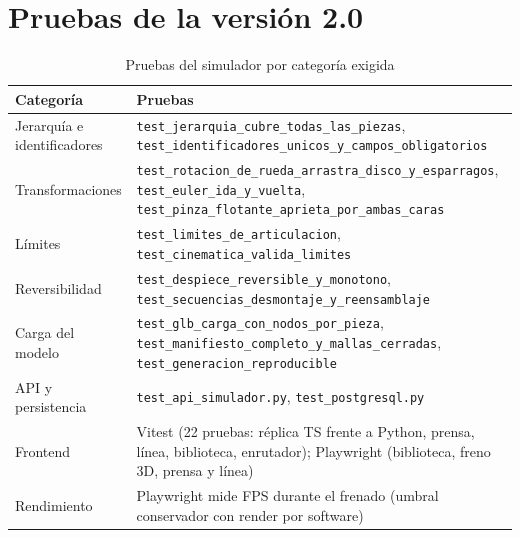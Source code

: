 \section{Pruebas de la versión 2.0}
\begin{table}[H]\centering\small
\caption{Pruebas del simulador por categoría exigida}\label{tab:sim-pruebas}
\begin{tabularx}{\linewidth}{@{}P{3.4cm} X@{}}\toprule
Categoría & Pruebas\\\midrule
Jerarquía e identificadores & \texttt{test\_jerarquia\_cubre\_todas\_las\_piezas}, \texttt{test\_identificadores\_unicos\_y\_campos\_obligatorios}\\
Transformaciones & \texttt{test\_rotacion\_de\_rueda\_arrastra\_disco\_y\_esparragos}, \texttt{test\_euler\_ida\_y\_vuelta}, \texttt{test\_pinza\_flotante\_aprieta\_por\_ambas\_caras}\\
Límites & \texttt{test\_limites\_de\_articulacion}, \texttt{test\_cinematica\_valida\_limites}\\
Reversibilidad & \texttt{test\_despiece\_reversible\_y\_monotono}, \texttt{test\_secuencias\_desmontaje\_y\_reensamblaje}\\
Carga del modelo & \texttt{test\_glb\_carga\_con\_nodos\_por\_pieza}, \texttt{test\_manifiesto\_completo\_y\_mallas\_cerradas}, \texttt{test\_generacion\_reproducible}\\
API y persistencia & \texttt{test\_api\_simulador.py}, \texttt{test\_postgresql.py}\\
Frontend & Vitest (22 pruebas: réplica TS frente a Python, prensa, línea, biblioteca, enrutador); Playwright (biblioteca, freno 3D, prensa y línea)\\
Rendimiento & Playwright mide FPS durante el frenado (umbral conservador con render por software)\\\bottomrule
\end{tabularx}
\end{table}
